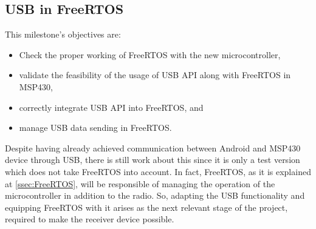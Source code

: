 	\subsection{USB in FreeRTOS}
	\label{ssec:USB.FreeRTOS}	
		This milestone's objectives are:
		\begin{itemize}
			\item Check the proper working of FreeRTOS with the new microcontroller,
			\item validate the feasibility of the usage of USB API along with FreeRTOS in MSP430,
			\item correctly integrate USB API into FreeRTOS, and
			\item manage USB data sending in FreeRTOS.
		\end{itemize}

		Despite having already achieved communication between Android and MSP430 device through USB, there is
		still work about this since it is only a test version which does not take FreeRTOS into account. In fact,
		FreeRTOS, as it is explained at \autoref{ssec:FreeRTOS}, will be responsible of managing the operation of
		the microcontroller in addition to the radio. So, adapting the USB functionality and equipping FreeRTOS
		with it arises as the next relevant stage of the project, required to make the receiver device possible.\\

